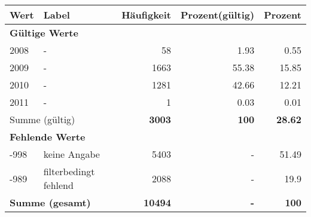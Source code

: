      \begin{longtable}{lXrrr}
     \toprule
     \textbf{Wert} & \textbf{Label} & \textbf{Häufigkeit} & \textbf{Prozent(gültig)} & \textbf{Prozent} \\
     \endhead
     \midrule
     \multicolumn{5}{l}{\textbf{Gültige Werte}}\\

     2008 &
     \multicolumn{1}{X}{ -  } &


       \num{58} &
       \num[round-mode=places,round-precision=2]{1,93} &
         \num[round-mode=places,round-precision=2]{0,55} \\

     2009 &
     \multicolumn{1}{X}{ -  } &


       \num{1663} &
       \num[round-mode=places,round-precision=2]{55,38} &
         \num[round-mode=places,round-precision=2]{15,85} \\

     2010 &
     \multicolumn{1}{X}{ -  } &


       \num{1281} &
       \num[round-mode=places,round-precision=2]{42,66} &
         \num[round-mode=places,round-precision=2]{12,21} \\

     2011 &
     \multicolumn{1}{X}{ -  } &


       \num{1} &
       \num[round-mode=places,round-precision=2]{0,03} &
         \num[round-mode=places,round-precision=2]{0,01} \\
     \midrule
     \multicolumn{2}{l}{Summe (gültig)} &
       \textbf{\num{3003}} &
     \textbf{100} &
       \textbf{\num[round-mode=places,round-precision=2]{28,62}} \\
     \multicolumn{5}{l}{\textbf{Fehlende Werte}}\\
       -998 &
       keine Angabe &
         \num{5403} &
        - &
         \num[round-mode=places,round-precision=2]{51,49} \\
       -989 &
       filterbedingt fehlend &
         \num{2088} &
        - &
         \num[round-mode=places,round-precision=2]{19,9} \\
     \midrule
     \multicolumn{2}{l}{\textbf{Summe (gesamt)}} &
          \textbf{\num{10494}} &
        \textbf{-} &
        \textbf{100} \\
     \bottomrule
     \end{longtable}
     
